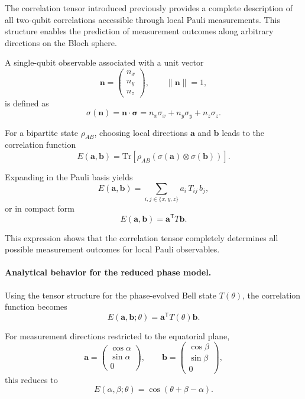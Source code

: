 \documentclass[a4paper]{article}
\begin{document}
The correlation tensor introduced previously provides a complete description of all two-qubit correlations accessible through local Pauli measurements. This structure enables the prediction of measurement outcomes along arbitrary directions on the Bloch sphere.

\medskip

A single-qubit observable associated with a unit vector
\[
\mathbf{n} =
\begin{pmatrix}
n_x\\
n_y\\
n_z
\end{pmatrix},
\qquad
\|\mathbf{n}\| = 1,
\]
is defined as
\[
\sigma(\mathbf{n})
=
\mathbf{n} \cdot \boldsymbol{\sigma}
=
n_x \sigma_x + n_y \sigma_y + n_z \sigma_z.
\]

\medskip

For a bipartite state \( \rho_{AB} \), choosing local directions \( \mathbf{a} \) and \( \mathbf{b} \) leads to the correlation function
\[
E(\mathbf{a},\mathbf{b})
=
\mathrm{Tr}
\left[
\rho_{AB}
\left(
\sigma(\mathbf{a}) \otimes \sigma(\mathbf{b})
\right)
\right].
\]

\medskip

Expanding in the Pauli basis yields
\[
E(\mathbf{a},\mathbf{b})
=
\sum_{i,j \in \{x,y,z\}}
a_i\, T_{ij}\, b_j,
\]
or in compact form
\[
E(\mathbf{a},\mathbf{b})
=
\mathbf{a}^{\mathsf T} T \mathbf{b}.
\]

\medskip

This expression shows that the correlation tensor completely determines all possible measurement outcomes for local Pauli observables.

\medskip

\paragraph{Analytical behavior for the reduced phase model.}

Using the tensor structure for the phase-evolved Bell state \( T(\theta) \), the correlation function becomes\[
E(\mathbf{a},\mathbf{b};\theta)
=
\mathbf{a}^{\mathsf T} T(\theta) \mathbf{b}.
\]

\medskip

For measurement directions restricted to the equatorial plane,
\[
\mathbf{a} =
\begin{pmatrix}
\cos\alpha\\
\sin\alpha\\
0
\end{pmatrix},
\qquad
\mathbf{b} =
\begin{pmatrix}
\cos\beta\\
\sin\beta\\
0
\end{pmatrix},
\]
this reduces to
\[
E(\alpha,\beta;\theta)
=
\cos(\theta + \beta - \alpha).
\]
\end{document}
